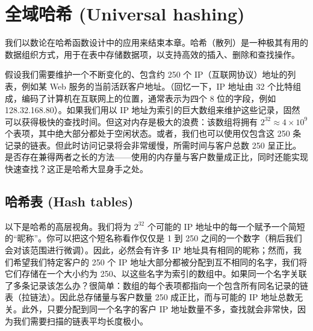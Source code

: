 \section{全域哈希 (Universal hashing)}

我们以数论在哈希函数设计中的应用来结束本章。哈希（散列）是一种极其有用的数据组织方式，用于在表中存储数据项，以支持高效的插入、删除和查找操作。

假设我们需要维护一个不断变化的、包含约 250 个 IP（互联网协议）地址的列表，例如某 Web 服务的当前活跃客户地址。（回忆一下，IP 地址由 32 个比特组成，编码了计算机在互联网上的位置，通常表示为四个 8 位的字段，例如 128.32.168.80）。如果我们用以 IP 地址为索引的巨大数组来维护这些记录，固然可以获得极快的查找时间。但这对内存是极大的浪费：该数组将拥有 $2^{32} \approx 4 \times 10^9$ 个表项，其中绝大部分都处于空闲状态。或者，我们也可以使用仅包含这 250 条记录的链表。但此时访问记录将会非常缓慢，所需时间与客户总数 250 呈正比。是否存在兼得两者之长的方法——使用的内存量与客户数量成正比，同时还能实现快速查找？这正是哈希大显身手之处。

\subsection{哈希表 (Hash tables)}
以下是哈希的高层视角。我们将为 $2^{32}$ 个可能的 IP 地址中的每一个赋予一个简短的“昵称”。你可以把这个短名称看作仅仅是 1 到 250 之间的一个数字（稍后我们会对该范围进行微调）。因此，必然会有许多 IP 地址具有相同的昵称；然而，我们希望我们特定客户的 250 个 IP 地址大部分都被分配到互不相同的名字，我们将它们存储在一个大小约为 250、以这些名字为索引的数组中。如果同一个名字关联了多条记录该怎么办？很简单：数组的每个表项都指向一个包含所有同名记录的链表（拉链法）。因此总存储量与客户数量 250 成正比，而与可能的 IP 地址总数无关。此外，只要分配到同一个名字的客户 IP 地址数量不多，查找就会非常快，因为我们需要扫描的链表平均长度极小。

